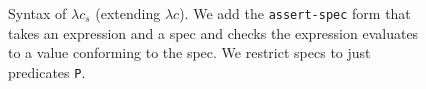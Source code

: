 %

\begin{figure}
\caption{Syntax of $\lambda c_s$ (extending $\lambda c$).
  We add the \texttt{assert-spec} form that takes an expression and a spec
  and checks the expression evaluates to a value conforming to the spec.
  We restrict specs to just predicates \texttt{P}.}
  \label{clojurespec-grammar}
\end{figure}

